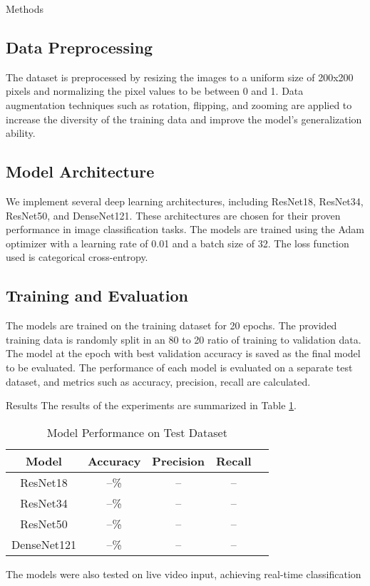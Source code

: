 \documentclass[12pt, a4paper]{article}
\begin{document}
\begin{section}{Methods}
    \subsection{Data Preprocessing}
    The dataset is preprocessed by resizing the images to a uniform size of 200x200 pixels and normalizing the pixel values to be between 0 and 1. Data augmentation techniques such as rotation, flipping, and zooming are applied to increase the diversity of the training data and improve the model's generalization ability.

    \subsection{Model Architecture}
    We implement several deep learning architectures, including ResNet18, ResNet34, ResNet50, and DenseNet121. These architectures are chosen for their proven performance in image classification tasks. The models are trained using the Adam optimizer with a learning rate of 0.01 and a batch size of 32. The loss function used is categorical cross-entropy.

    \subsection{Training and Evaluation}
    The models are trained on the training dataset for 20 epochs. The provided training data is randomly split in an 80 to 20 ratio of training to validation data. The model at the epoch with best validation accuracy is saved as the final model to be evaluated. The performance of each model is evaluated on a separate test dataset, and metrics such as accuracy, precision, recall are calculated.
\end{section}

\begin{section}{Results}
    The results of the experiments are summarized in Table \ref{tab:results}. 
    \begin{table}[H]
        \centering
        \caption{Model Performance on Test Dataset}
        \label{tab:results}
        \begin{tabular}{|c|c|c|c|c|}
            \hline
            Model & Accuracy & Precision & Recall \\
            \hline
            ResNet18 &--\% & -- & -- \\
            ResNet34 & --\% & -- & --  \\
            ResNet50 & --\% & -- & --  \\
            DenseNet121 & --\% & -- & --  \\
            \hline
        \end{tabular}
    \end{table}

    The models were also tested on live video input, achieving real-time classification 
\end{section}
\end{document}
